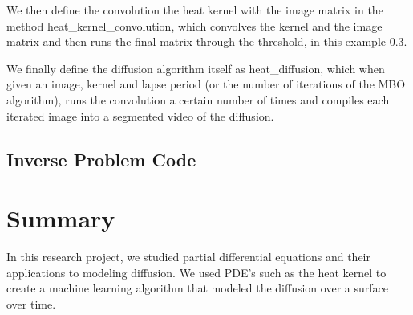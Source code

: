 \documentclass[12pt]{article}
\theoremstyle{plain}
\theoremstyle{definition}
\theoremstyle{remark}
\begin{document}
We then define the convolution the heat kernel with the image matrix in the method heat\_kernel\_convolution, which convolves the kernel and the image matrix and then runs the final matrix through the threshold, in this example 0.3. 

We finally define the diffusion algorithm itself as heat\_diffusion, which when given an image, kernel and lapse period (or the number of iterations of the MBO algorithm), runs the convolution a certain number of times and compiles each iterated image into a segmented video of the diffusion. 

\subsection{Inverse Problem Code}

\section{Summary}
In this research project, we studied partial differential equations and their applications to modeling diffusion. We used PDE's such as the heat kernel to create a machine learning algorithm that modeled the diffusion over a surface over time. 

\printbibliography
\end{document}
